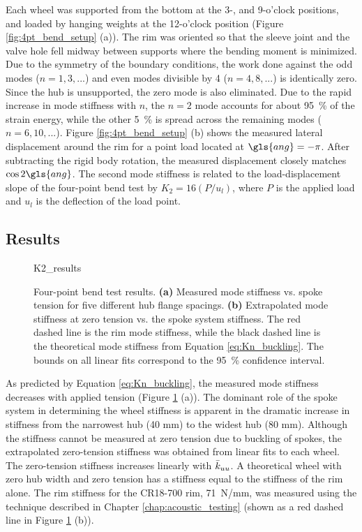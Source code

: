 \documentclass[\rootdir/thesis.tex]{subfiles}
\begin{document}
Each wheel was supported from the bottom at the 3-, and 9-o'clock positions, and loaded by hanging weights at the 12-o'clock position (Figure \ref{fig:4pt_bend_setup} (a)). The rim was oriented so that the sleeve joint and the valve hole fell midway between supports where the bending moment is minimized. Due to the symmetry of the boundary conditions, the work done against the odd modes ($n=1, 3, ...$) and even modes divisible by 4 ($n=4, 8, ...$) is identically zero. Since the hub is unsupported, the zero mode is also eliminated. Due to the rapid increase in mode stiffness with $n$, the $n=2$ mode accounts for about \SI{95}{\percent} of the strain energy, while the other \SI{5}{\percent} is spread across the remaining modes ($n=6, 10, ...$). Figure \ref{fig:4pt_bend_setup} (b) shows the measured lateral displacement around the rim for a point load located at $\gls{ang}=-\pi$. After subtracting the rigid body rotation, the measured displacement closely matches $\cos{2\gls{ang}}$. The second mode stiffness is related to the load-displacement slope of the four-point bend test by $K_2 = 16(P/u_l)$, where $P$ is the applied load and $u_l$ is the deflection of the load point.

\subsection{Results}
\label{sec:K2_T_results}

\begin{figure}[t]
\centering
{K2_results}
\caption{Four-point bend test results. \textbf{(a)} Measured mode stiffness vs. spoke tension for five different hub flange spacings. \textbf{(b)} Extrapolated mode stiffness at zero tension vs. the spoke system stiffness. The red dashed line is the rim mode stiffness, while the black dashed line is the theoretical mode stiffness from Equation \eqref{eq:Kn_buckling}. The bounds on all linear fits correspond to the \SI{95}{\percent} confidence interval.}
\label{fig:K2_results}
\end{figure}

As predicted by Equation \eqref{eq:Kn_buckling}, the measured mode stiffness decreases with applied tension (Figure \ref{fig:K2_results} (a)). The dominant role of the spoke system in determining the wheel stiffness is apparent in the dramatic increase in stiffness from the narrowest hub (40 mm) to the widest hub (80 mm). Although the stiffness cannot be measured at zero tension due to buckling of spokes, the extrapolated zero-tension stiffness was obtained from linear fits to each wheel. The zero-tension stiffness increases linearly with $\bar{k}_{uu}$. A theoretical wheel with zero hub width and zero tension has a stiffness equal to the stiffness of the rim alone. The rim stiffness for the CR18-700 rim, \SI{71}{N/mm}, was measured using the technique described in Chapter \ref{chap:acoustic_testing} (shown as a red dashed line in Figure \ref{fig:K2_results} (b)).
\end{document}
